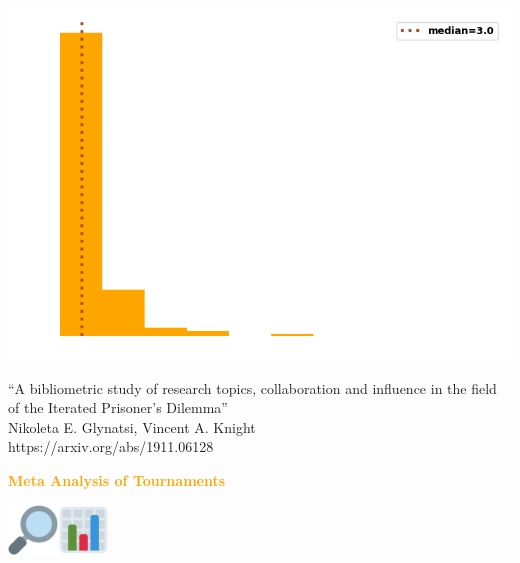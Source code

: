 \documentclass{beamer}
\begin{document}
\begin{frame}
    \begin{center}
        \includegraphics[width=.7\textwidth]{static/degree_dist.png}
    \end{center}
\end{frame}

\begin{frame}
    \begin{center}
        \large{``A bibliometric study of research topics, collaboration and influence in the field of the Iterated Prisoner's Dilemma''} \\ \vspace{.5cm}
        \footnotesize{Nikoleta E. Glynatsi, Vincent A. Knight} \\ \vspace{.5cm}
        \footnotesize{https://arxiv.org/abs/1911.06128}
    \end{center}
\end{frame}

\begin{frame}
    \begin{center}
    \textcolor{orange}{\large{\textbf{Meta Analysis of Tournaments}}} \vspace{1cm}

    \includegraphics[width=0.10\textwidth]{static/look.png}\hspace{2pt}\includegraphics[width=0.10\textwidth]{static/bar.png}
    \end{center}
\end{frame}
\end{document}
